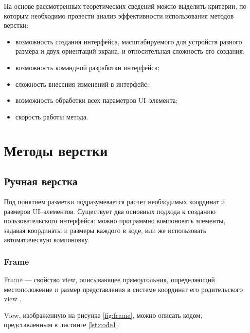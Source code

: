 На основе рассмотренных теоретических сведений можно выделить критерии, по которым необходимо провести анализ эффективности использования методов верстки:

\begin{itemize}[label=---]
	\item возможность создания интерфейса, масштабируемого для устройств разного размера и двух ориентаций экрана, и относительная сложность его создания;
	\item возможность командной разработки интерфейса;
	\item сложность внесения изменений в интерфейс;
	\item возможность обработки всех параметров UI--элемента;
	\item скорость работы метода.
\end{itemize}


\section{Методы верстки} \label{analysis}

\subsection{Ручная верстка}

Под понятием разметки подразумевается расчет необходимых координат и размеров UI--элементов.
Существует два основных подхода к созданию пользовательского интерфейса: можно программно компоновать элементы, задавая координаты и размеры каждого в коде, или же использовать автоматическую компоновку.

\subsubsection{Frame}

Frame \cite{frame} --- свойство view, описывающее прямоугольник, определяющий местоположение и размер представления в системе координат его родительского view \cite{superview}.

View, изображенную на рисунке \ref{fig:frame}, можно описать кодом, представленным в листинге \ref{lst:code1}. 

